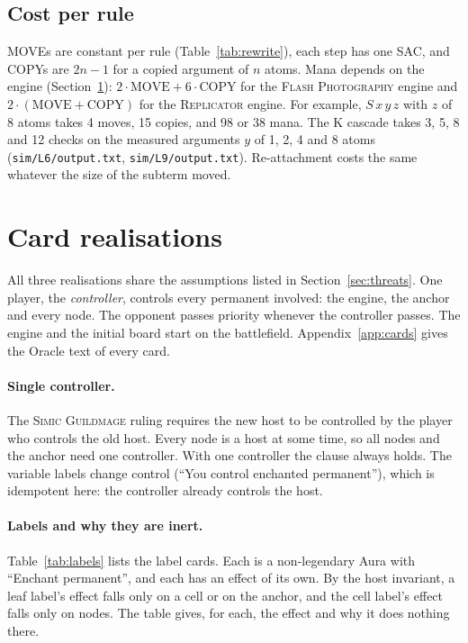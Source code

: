 \documentclass[11pt]{article}
\theoremstyle{definition}
\newcommand{\card}[1]{{\mdseries\scshape #1}}
\begin{document}
\subsection{Cost per rule}

MOVEs are constant per rule (Table~\ref{tab:rewrite}), each step has one SAC, and COPYs
are $2n-1$ for a copied argument of $n$ atoms. Mana depends on the engine
(Section~\ref{sec:cards}): $2\cdot\mathrm{MOVE} + 6\cdot\mathrm{COPY}$ for the \card{Flash
Photography} engine and $2\cdot(\mathrm{MOVE}+\mathrm{COPY})$ for the \card{Replicator}
engine. For example, $S\,x\,y\,z$ with $z$ of 8 atoms takes 4 moves, 15 copies, and 98
or 38 mana. The K cascade takes 3, 5, 8 and 12 checks on the measured arguments $y$ of 1,
2, 4 and 8 atoms (\texttt{sim/L6/output.txt}, \texttt{sim/L9/output.txt}). Re-attachment
costs the same whatever the size of the subterm moved.

\section{Card realisations}\label{sec:cards}

All three realisations share the assumptions listed in Section~\ref{sec:threats}. One
player, the \emph{controller}, controls every permanent involved: the engine, the anchor
and every node. The opponent passes priority whenever the controller passes. The engine
and the initial board start on the battlefield. Appendix~\ref{app:cards} gives the Oracle
text of every card.

\paragraph{Single controller.} The \card{Simic Guildmage} ruling requires the new host to be
controlled by the player who controls the old host. Every node is a host at some time, so
all nodes and the anchor need one controller. With one controller the clause always
holds. The variable labels change control (``You control enchanted permanent''), which is
idempotent here: the controller already controls the host.

\paragraph{Labels and why they are inert.} Table~\ref{tab:labels} lists the label cards.
Each is a non-legendary Aura with ``Enchant permanent'', and each has an effect of its own.
By the host invariant, a leaf label's effect falls only on a cell or on the anchor, and
the cell label's effect falls only on nodes. The table gives, for each, the effect and why
it does nothing there.
\end{document}
